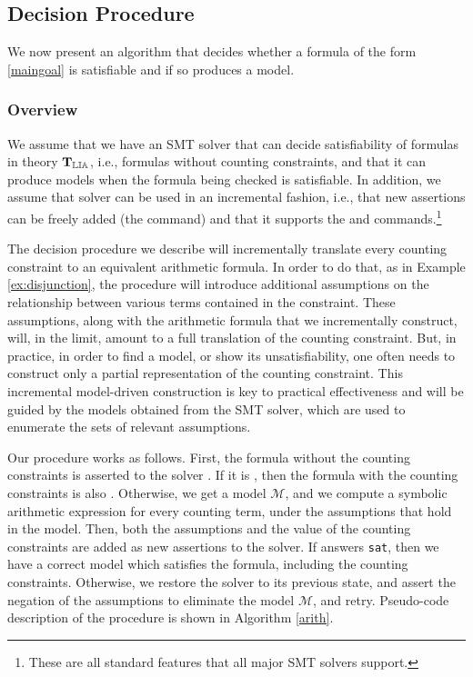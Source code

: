 \subsection{Decision Procedure}

We now present an algorithm that decides whether a formula of the form
\ref{maingoal} is satisfiable and if so produces a model.

\subsubsection{Overview}

We assume that we have an SMT solver \solver that can decide
satisfiability of formulas in theory $\operatorname{\mathbf{T}_{\mathbb{LIA}}}$, i.e., formulas without
counting constraints, and that it can produce models when
the formula being checked is satisfiable. In addition, we assume that
solver \solver can be used in an incremental fashion, i.e., that new
assertions can be freely added (the \assert command) and that it
supports the \push and \pop commands.\footnote{These are all standard
features that all major SMT solvers support.}

The decision procedure we describe will incrementally translate every
counting constraint to an equivalent arithmetic formula. In order to
do that, as in Example \ref{ex:disjunction}, the procedure will
introduce additional assumptions on the relationship between various
terms contained in the constraint. These assumptions, along with the
arithmetic formula that we incrementally construct, will, in the
limit, amount to a full translation of the counting constraint. But,
in practice, in order to find a model, or show its unsatisfiability,
one often needs to construct only a partial representation of the
counting constraint. This incremental model-driven construction is key
to practical effectiveness and will be guided by the models obtained
from the SMT solver, which are used to enumerate the sets of relevant
assumptions.

Our procedure works as follows. First, the formula without the
counting constraints is asserted to the solver \solver. If it is
\unsat, then the formula with the counting constraints is also
\sat. Otherwise, we get a model $\mathcal{M}$, and we
compute a symbolic arithmetic expression for every counting term,
under the assumptions that hold in the model. Then, both the
assumptions and the value of the counting constraints are added as new
assertions to the solver. If \solver answers \texttt{sat}, then we
have a correct model which satisfies the formula, including the
counting constraints. Otherwise, we restore the solver to its previous
state, and assert the negation of the assumptions to eliminate the
model $\mathcal{M}$, and retry. Pseudo-code description of the
procedure is shown in Algorithm \ref{arith}.

